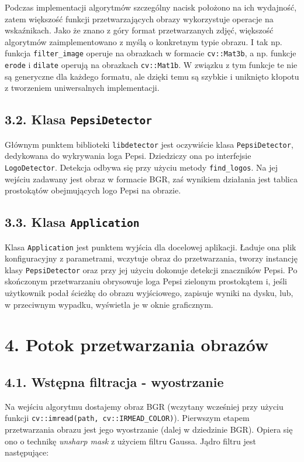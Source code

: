 \documentclass[11pt,a4paper,twoside]{report}
\begin{document}
		Podczas implementacji algorytmów szczególny nacisk położono na ich wydajność, zatem większość funkcji przetwarzających obrazy wykorzystuje operacje na wskaźnikach. Jako że znano z góry format przetwarzanych zdjęć, większość algorytmów zaimplementowano z myślą o konkretnym typie obrazu. I tak np. funkcja \texttt{filter\_image} operuje na obrazkach w formacie \texttt{cv::Mat3b}, a np. funkcje \texttt{erode} i \texttt{dilate} operują na obrazkach \texttt{cv::Mat1b}. W związku z tym funkcje te nie są generyczne dla każdego formatu, ale dzięki temu są szybkie i uniknięto kłopotu z tworzeniem uniwersalnych implementacji.

	\subsection*{3.2. Klasa \texttt{PepsiDetector}}

		Głównym punktem biblioteki \texttt{libdetector} jest oczywiście klasa \texttt{PepsiDetector}, dedykowana do wykrywania loga Pepsi. Dziedziczy ona po interfejsie \texttt{LogoDetector}. Detekcja odbywa się przy użyciu metody \texttt{find\_logos}. Na jej wejściu zadawany jest obraz w formacie BGR, zaś wynikiem działania jest tablica prostokątów obejmujących logo Pepsi na obrazie.

	\subsection*{3.3. Klasa \texttt{Application}}

		Klasa \texttt{Application} jest punktem wyjścia dla docelowej aplikacji. Ładuje ona plik konfiguracyjny z parametrami, wczytuje obraz do przetwarzania, tworzy instancję klasy \texttt{PepsiDetector} oraz przy jej użyciu dokonuje detekcji znaczników Pepsi. Po skończonym przetwarzaniu obrysowuje loga Pepsi zielonym prostokątem i, jeśli użytkownik podał ścieżkę do obrazu wyjściowego, zapisuje wyniki na dysku, lub, w przeciwnym wypadku, wyświetla je w oknie graficznym.

\section*{4. Potok przetwarzania obrazów}

	\subsection*{4.1. Wstępna filtracja - wyostrzanie}

			Na wejściu algorytmu dostajemy obraz BGR (wczytany wcześniej przy użyciu funkcji \texttt{cv::imread(path, cv::IRMEAD\_COLOR)}). Pierwszym etapem przetwarzania obrazu jest jego wyostrzanie (dalej w dziedzinie BGR). Opiera się ono o technikę \emph{unsharp mask} z użyciem filtru Gaussa. Jądro filtru jest następujące:
\end{document}
